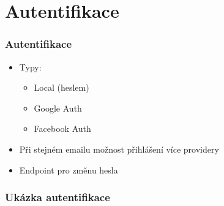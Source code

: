 \documentclass[aspectratio=43]{beamer}
\begin{document}
\section{Autentifikace}
\begin{frame}[fragile]
	\frametitle{Autentifikace}
		\begin{itemize}
			\item Typy:
						\begin{itemize}
							\item Local (heslem)
							\item Google Auth
							\item Facebook Auth
						\end{itemize}
			\item Při stejném emailu možnost přihlášení více providery
			\item Endpoint pro změnu hesla
		\end{itemize}


\end{frame}

\begin{frame}[fragile]
	\frametitle{Ukázka autentifikace}
	
\end{frame}
\end{document}
